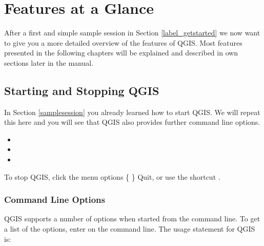 
\chapter{Features at a Glance}\label{feature_glance}


After a first and simple sample session in Section \ref{label_getstarted} we now
want to give you a more detailed overview of the features of QGIS.
Most features presented in the following chapters will be explained and described in
own sections later in the manual.

\section{Starting and Stopping QGIS}\label{label_startinqgis}

In Section \ref{samplesession} you already learned how to start QGIS. We will
repeat this here and you will see that QGIS also provides further command line options.

\begin{itemize}
\item {}
\item {}
\item {}
\end{itemize}

To stop QGIS, click the menu options \{\nix{} \} \arrow Quit,
or use the shortcut .

\subsection{Command Line Options}
\label{label_commandline}

\nix QGIS supports a number of options when started from the command line. To
get a list of the options, enter  on the command line.
The usage statement for QGIS is:

